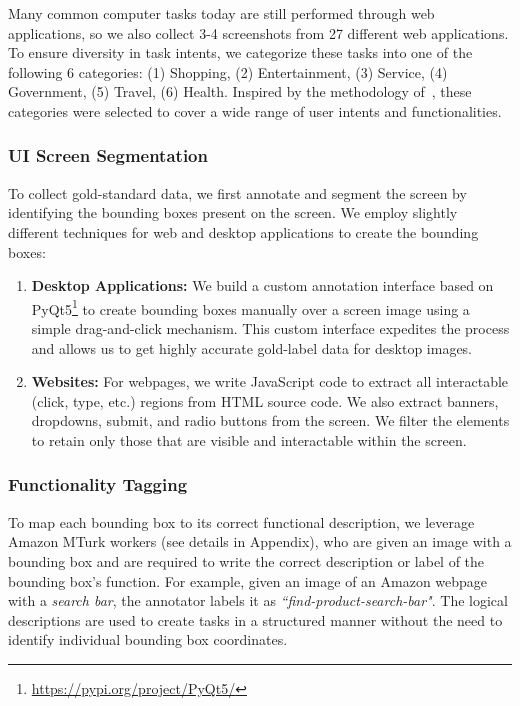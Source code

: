 Many common computer tasks today are still performed through web applications, so we also collect 3-4 screenshots from 27 different web applications. To ensure diversity in task intents, we categorize these tasks into one of the following 6 categories: (1) Shopping, (2) Entertainment, (3) Service, (4) Government, (5) Travel, (6) Health. Inspired by the methodology of~\cite{deng2023mind2web}, these categories were selected to cover a wide range of user intents and functionalities.

\subsubsection{UI Screen Segmentation}
To collect gold-standard data, we first annotate and segment the screen by identifying the bounding boxes present on the screen. We employ slightly different techniques for web and desktop applications to create the bounding boxes:

\begin{enumerate}
    \item \textbf{Desktop Applications:} We build a custom annotation interface based on PyQt5\footnote{\url{https://pypi.org/project/PyQt5/}} to create bounding boxes manually over a screen image using a simple drag-and-click mechanism. This custom interface expedites the process and allows us to get highly accurate gold-label data for desktop images.
    \item \textbf{Websites:} For webpages, we write JavaScript code to extract all interactable (click,  type, etc.) regions from HTML source code. We also extract banners, dropdowns, submit, and radio buttons from the screen. We filter the elements to retain only those that are visible and interactable within the screen.
\end{enumerate}

\subsubsection{Functionality Tagging}

To map each bounding box to its correct functional description, we leverage Amazon MTurk workers (see details in Appendix), who are given an image with a bounding box and are required to write the correct description or label of the bounding box's function. For example, given an image of an Amazon webpage with a \textit{search bar}, the annotator labels it as \textit{``find-product-search-bar"}. The logical descriptions are used to create tasks in a structured manner without the need to identify individual bounding box coordinates.

